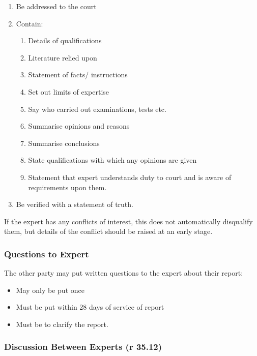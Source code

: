 \documentclass[
]{article}
\providecommand{\tightlist}{%
  \setlength{\itemsep}{0pt}\setlength{\parskip}{0pt}}
\begin{document}
\begin{enumerate}
\def\labelenumi{\arabic{enumi}.}
\tightlist
\item
  Be addressed to the court
\item
  Contain:

  \begin{enumerate}
  \def\labelenumii{\arabic{enumii}.}
  \tightlist
  \item
    Details of qualifications
  \item
    Literature relied upon
  \item
    Statement of facts/ instructions
  \item
    Set out limits of expertise
  \item
    Say who carried out examinations, tests etc.
  \item
    Summarise opinions and reasons
  \item
    Summarise conclusions
  \item
    State qualifications with which any opinions are given
  \item
    Statement that expert understands duty to court and is aware of
    requirements upon them.
  \end{enumerate}
\item
  Be verified with a statement of truth.
\end{enumerate}

If the expert has any conflicts of interest, this does not automatically
disqualify them, but details of the conflict should be raised at an
early stage.

\hypertarget{questions-to-expert}{%
\subsubsection{Questions to Expert}\label{questions-to-expert}}

The other party may put written questions to the expert about their
report:

\begin{itemize}
\tightlist
\item
  May only be put once
\item
  Must be put within 28 days of service of report
\item
  Must be to clarify the report.
\end{itemize}

\hypertarget{discussion-between-experts-r-35.12}{%
\subsubsection{Discussion Between Experts (r
35.12)}\label{discussion-between-experts-r-35.12}}
\end{document}
